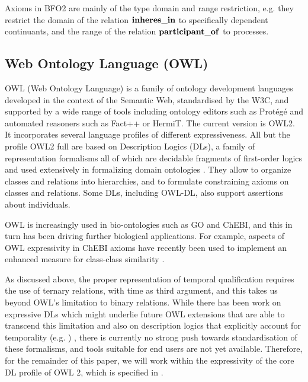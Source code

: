 Axioms in BFO2 are mainly of the type domain and range restriction, e.g. they restrict the domain of the relation $\mathrm{\mathbf{inheres\_in}}$ to specifically 
dependent continuants, and the range of the relation $\mathrm{\mathbf{participant\_of}}$ to processes.  



\subsection*{Web Ontology Language (OWL)}

OWL (Web Ontology Language) is a family of ontology development languages developed in the context of the Semantic Web, 
standardised by the W3C, and supported by a wide range of tools including ontology editors such as Prot\'eg\'e 
and automated reasoners such as Fact++ or HermiT. 
The current version is OWL2\cite{grau2008}. It incorporates several language profiles of different expressiveness. All but the profile OWL2 full are based on Description Logics (DLs), a family of
representation formalisms all of which are decidable fragments of first-order logics and used extensively in formalizing domain ontologies \cite{baader2007dlhandbook}. They allow to organize classes and relations into hierarchies, and to formulate constraining axioms on classes and relations. 
Some DLs, including OWL-DL, also support assertions about individuals. 

OWL is increasingly used in bio-ontologies such as GO and ChEBI, and this in turn has been driving further biological applications. For example, aspects of OWL expressivity in ChEBI axioms have recently been used to implement an enhanced measure for class-class similarity \cite{ferreira2013exploiting}.


As discussed above, the proper representation of temporal qualification requires the use of ternary relations, with time as third argument, and this takes us beyond OWL's limitation to binary relations. While there has been work on expressive DLs which might underlie future OWL extensions that are able to transcend this limitation \cite{Calvanese:1997} and also on description logics that explicitly account for temporality (e.g. \cite{Wolter:2001}) , there is currently no strong push towards standardisation of these formalisms, and tools suitable for end users are not yet available. Therefore, for the remainder of this paper, we will work within the expressivity of the core DL profile of OWL 2, which is specified in \cite{OWL2:direct}.  

